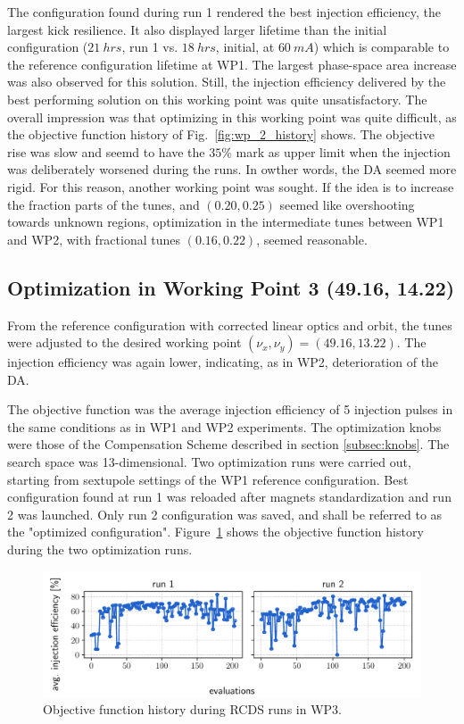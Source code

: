 The configuration found during run 1 rendered the best injection efficiency, the largest kick resilience. It also displayed larger lifetime than the initial configuration ($21~\unit{hrs}$, run 1 vs. $18~\unit{hrs}$, initial, at $60~\unit{mA}$) which is comparable to the reference configuration lifetime at WP1. The largest phase-space area increase was also observed for this solution. Still, the injection efficiency delivered by the best performing solution on this working point was quite unsatisfactory. The overall impression was that optimizing in this working point was quite difficult, as the objective function history of Fig.~\ref{fig:wp_2_history} shows. The objective rise was slow and seemd to have the $35\%$ mark as upper limit when the injection was deliberately worsened during the runs. In owther words, the DA seemed more rigid. For this reason, another working point was sought. If the idea is to increase the fraction parts of the tunes, and $(0.20, 0.25)$ seemed like overshooting towards unknown regions, optimization in the intermediate tunes between WP1 and WP2, with fractional tunes $(0.16, 0.22)$, seemed reasonable.
\subsection{Optimization in Working Point 3 (49.16, 14.22)}
From the reference configuration with corrected linear optics and orbit, the tunes were adjusted to the desired working point $(\nu_x, \nu_y)=(49.16, 13.22)$. The injection efficiency was again lower, indicating, as in WP2, deterioration of the DA.

The objective function was the average injection efficiency of 5 injection pulses in the same conditions as in WP1 and WP2 experiments. The optimization knobs were those of the Compensation Scheme described in section \ref{subsec:knobs}. The search space was 13-dimensional. 
Two optimization runs were carried out, starting from sextupole settings of the WP1 reference configuration. Best configuration found at run 1 was reloaded after magnets standardization and run 2 was launched. Only run 2 configuration was saved, and shall be referred to as the "optimized configuration". Figure~\ref{fig:wp3_history} shows the objective function history during the two optimization runs.
\begin{figure}[tb]
    \centering
    \includegraphics[width=\columnwidth]{Images/wp3_objfunc_hist.pdf}
    \caption[Objective function history during RCDS runs in WP3.]{Objective function history during RCDS runs in WP3.}
    \label{fig:wp3_history}
\end{figure}
